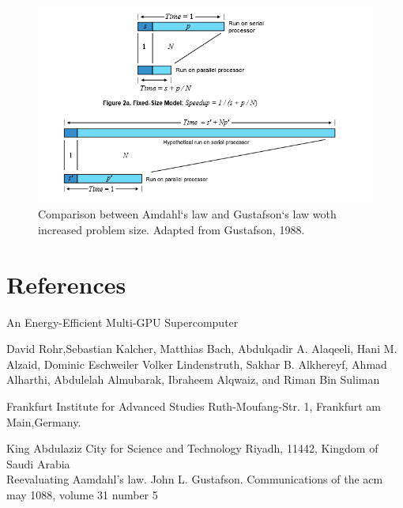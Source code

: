 \documentclass[a4paper]{article}
\begin{document}
\begin{figure}[-ht]
\includegraphics[width=\textwidth]{Law}
\caption{Comparison between Amdahl`s law and Gustafson`s law woth increased problem size. Adapted from Gustafson, 1988.}
\end{figure}





\section{References}

An Energy-Efficient Multi-GPU Supercomputer

David Rohr,Sebastian Kalcher, Matthias Bach, Abdulqadir A. Alaqeeli, Hani M. Alzaid, Dominic Eschweiler
Volker Lindenstruth, Sakhar B. Alkhereyf, Ahmad Alharthi, Abdulelah Almubarak, Ibraheem Alqwaiz, and Riman Bin Suliman 

Frankfurt Institute for Advanced Studies Ruth-Moufang-Str. 1, Frankfurt am Main,Germany.

King Abdulaziz City for Science and Technology Riyadh, 11442, Kingdom of Saudi Arabia
\\
Reevaluating Aamdahl’s law. John L. Gustafson. Communications of the acm may 1088, volume 31 number 5
\end{document}
